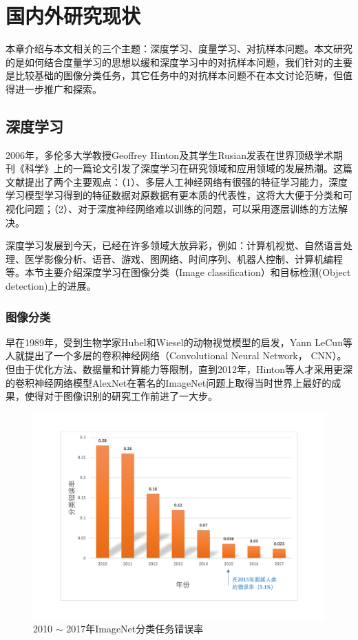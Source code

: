 \chapter{国内外研究现状}

本章介绍与本文相关的三个主题：深度学习、度量学习、对抗样本问题。本文研究的是如何结合度量学习的思想以缓和深度学习中的对抗样本问题，我们针对的主要是比较基础的图像分类任务，其它任务中的对抗样本问题不在本文讨论范畴，但值得进一步推广和探索。

\section{深度学习}

2006年，多伦多大学教授Geoffrey Hinton及其学生Rusian发表在世界顶级学术期刊《科学》上的一篇论文引发了深度学习在研究领域和应用领域的发展热潮\cite{hinton2006reducing}。这篇文献提出了两个主要观点：（1）、多层人工神经网络有很强的特征学习能力，深度学习模型学习得到的特征数据对原数据有更本质的代表性，这将大大便于分类和可视化问题；（2）、对于深度神经网络难以训练的问题，可以采用逐层训练的方法解决。

深度学习发展到今天，已经在许多领域大放异彩，例如：计算机视觉、自然语言处理、医学影像分析、语音、游戏、图网络、时间序列、机器人控制、计算机编程等。本节主要介绍深度学习在图像分类（Image classification）和目标检测(Object detection)上的进展。

\subsection{图像分类}

早在1989年，受到生物学家Hubel和Wiesel的动物视觉模型\cite{hubel1962receptive}的启发，Yann LeCun等人就提出了一个多层的卷积神经网络（Convolutional Neural Network， CNN）\cite{lecun1989backpropagation}。但由于优化方法、数据量和计算能力等限制，直到2012年，Hinton等人才采用更深的卷积神经网络模型AlexNet在著名的ImageNet问题上取得当时世界上最好的成果，使得对于图像识别的研究工作前进了一大步\cite{krizhevsky2012imagenet}。

\begin{figure}[h]
    \centering
    \includegraphics[width=15cm]{fig/imagenet.pdf}
    \caption{2010 $\sim$ 2017年ImageNet分类任务错误率}
    \label{fig:imagenet}
\end{figure}

